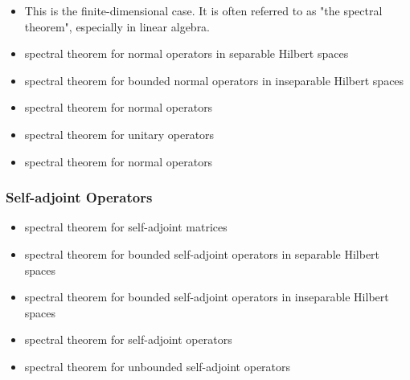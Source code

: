 \documentclass[12pt]{article}
\begin{document}
\begin{itemize}
\item {}

This is the finite-dimensional case. It is often referred to as "the spectral theorem", especially in linear algebra.
\end{itemize}
\begin{itemize}
\item spectral theorem for  normal operators in separable Hilbert spaces
\end{itemize}
\begin{itemize}
\item spectral theorem for bounded normal operators in inseparable Hilbert spaces
\end{itemize}
\begin{itemize}
\item spectral theorem for  normal operators
\end{itemize}
\begin{itemize}
\item spectral theorem for unitary operators
\end{itemize}
\begin{itemize}
\item spectral theorem for   normal operators
\end{itemize}

\subsubsection{Self-adjoint Operators}

\begin{itemize}
\item spectral theorem for self-adjoint matrices
\end{itemize}
\begin{itemize}
\item spectral theorem for bounded self-adjoint operators in separable Hilbert spaces
\end{itemize}
\begin{itemize}
\item spectral theorem for bounded self-adjoint operators in inseparable Hilbert spaces
\end{itemize}
\begin{itemize}
\item spectral theorem for  self-adjoint operators
\end{itemize}
\begin{itemize}
\item spectral theorem for unbounded self-adjoint operators
\end{itemize}
\end{document}
